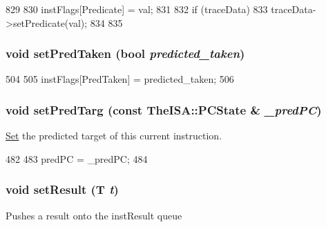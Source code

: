 \begin{DoxyCode}
829     {
830         instFlags[Predicate] = val;
831 
832         if (traceData) {
833             traceData->setPredicate(val);
834         }
835     }
\end{DoxyCode}
\hypertarget{classBaseDynInst_a62ee27d8bfd75838ea10c9dc8f97babc}{
\subsubsection[{setPredTaken}]{\setlength{\rightskip}{0pt plus 5cm}void setPredTaken (bool {\em predicted\_\-taken})}}
\label{classBaseDynInst_a62ee27d8bfd75838ea10c9dc8f97babc}



\begin{DoxyCode}
504     {
505         instFlags[PredTaken] = predicted_taken;
506     }
\end{DoxyCode}
\hypertarget{classBaseDynInst_af3e113981ea1684fcf025086404d5f01}{
\subsubsection[{setPredTarg}]{\setlength{\rightskip}{0pt plus 5cm}void setPredTarg (const TheISA::PCState \& {\em \_\-predPC})}}
\label{classBaseDynInst_af3e113981ea1684fcf025086404d5f01}
\hyperlink{classSet}{Set} the predicted target of this current instruction. 


\begin{DoxyCode}
482     {
483         predPC = _predPC;
484     }
\end{DoxyCode}
\hypertarget{classBaseDynInst_accfdfc918ee73975e86b08cf8a528479}{
\subsubsection[{setResult}]{\setlength{\rightskip}{0pt plus 5cm}void setResult (T {\em t})}}
\label{classBaseDynInst_accfdfc918ee73975e86b08cf8a528479}
Pushes a result onto the instResult queue 


